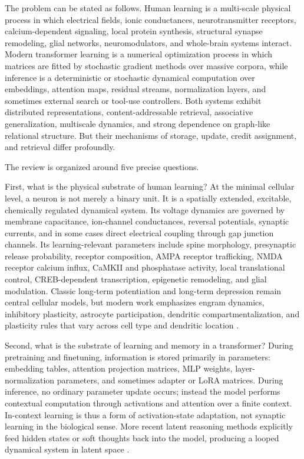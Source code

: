 \documentclass[11pt]{article}
\newcommand{\1}{\mathbf{1}}
\begin{document}
The problem can be stated as follows. Human learning is a multi-scale physical process in which electrical fields, ionic conductances, neurotransmitter receptors, calcium-dependent signaling, local protein synthesis, structural synapse remodeling, glial networks, neuromodulators, and whole-brain systems interact. Modern transformer learning is a numerical optimization process in which matrices are fitted by stochastic gradient methods over massive corpora, while inference is a deterministic or stochastic dynamical computation over embeddings, attention maps, residual streams, normalization layers, and sometimes external search or tool-use controllers. Both systems exhibit distributed representations, content-addressable retrieval, associative generalization, multiscale dynamics, and strong dependence on graph-like relational structure. But their mechanisms of storage, update, credit assignment, and retrieval differ profoundly.

The review is organized around five precise questions.

First, what is the physical substrate of human learning? At the minimal cellular level, a neuron is not merely a binary unit. It is a spatially extended, excitable, chemically regulated dynamical system. Its voltage dynamics are governed by membrane capacitance, ion-channel conductances, reversal potentials, synaptic currents, and in some cases direct electrical coupling through gap junction channels. Its learning-relevant parameters include spine morphology, presynaptic release probability, receptor composition, AMPA receptor trafficking, NMDA receptor calcium influx, CaMKII and phosphatase activity, local translational control, CREB-dependent transcription, epigenetic remodeling, and glial modulation. Classic long-term potentiation and long-term depression remain central cellular models, but modern work emphasizes engram dynamics, inhibitory plasticity, astrocyte participation, dendritic compartmentalization, and plasticity rules that vary across cell type and dendritic location \cite{BlissLomo1973,BiPoo1998,Hayashi2022,Nicoll2023,Choucry2024,Tome2024,Wright2025}.

Second, what is the substrate of learning and memory in a transformer? During pretraining and finetuning, information is stored primarily in parameters: embedding tables, attention projection matrices, MLP weights, layer-normalization parameters, and sometimes adapter or LoRA matrices. During inference, no ordinary parameter update occurs; instead the model performs contextual computation through activations and attention over a finite context. In-context learning is thus a form of activation-state adaptation, not synaptic learning in the biological sense. More recent latent reasoning methods explicitly feed hidden states or soft thoughts back into the model, producing a looped dynamical system in latent space \cite{Vaswani2017,Yun2020,Ramsauer2021,Hao2024,Saunshi2025,SoftCoT2025,ZhuLatentSurvey2025,ZhuOuro2025}.
\end{document}
